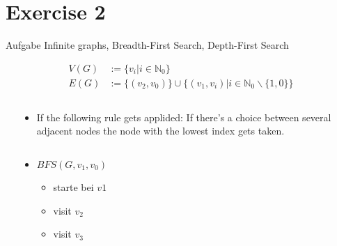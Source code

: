 
\section{Exercise 2}

\setcounter{exercise}{1}

\begin{frame}[allowframebreaks]{Aufgabe \thesection}{Infinite graphs, Breadth-First Search, Depth-First Search}
  \begin{exercisenoinc}    
    \begin{align*}
      V(G) &:= \{v_i | i \in \mathbb{N}_0\}\\
      E(G) &:= \{(v_2,v_0)\}\cup \{(v_1,v_i)| i \in \mathbb{N}_0\backslash \{1,0\}\}
    \end{align*}
  \end{exercisenoinc}
  \begin{solution}
    \begin{columns}
      \begin{column}[t]{0.5\textwidth}
      \end{column}
      \begin{column}[t]{0.5\textwidth}
        \vspace{0.25cm}
        \begin{itemize}
          \item \alert{If the following rule gets applided:} If there's a choice between several adjacent nodes the node with the lowest index gets taken.
        \end{itemize}
        \begin{columns}
          \begin{column}[t]{0.5\linewidth}
            \begin{itemize}
              \item $BFS(G, v_1, v_0)$
              \begin{itemize}
                \item starte bei $v1$
                \item visit $v_2$
                \item visit $v_3$

\end{itemize}
\end{itemize}
\end{column}
\end{columns}
\end{column}
\end{columns}
\end{solution}
\end{frame}
